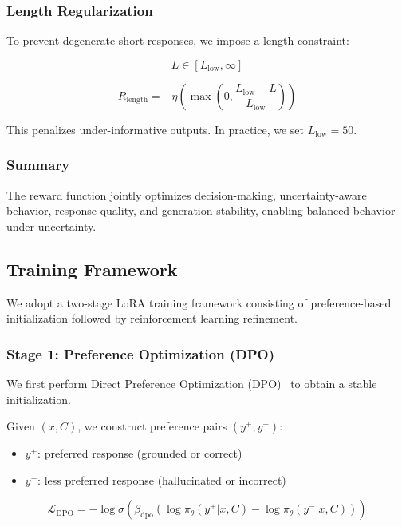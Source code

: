 \subsubsection{Length Regularization}

To prevent degenerate short responses, we impose a length constraint:

\[
L \in [L_{\text{low}}, \infty]
\]

\[
R_{\text{length}} =
-\eta \left(
\max\left(0, \frac{L_{\text{low}} - L}{L_{\text{low}}}\right)
\right)
\]

This penalizes under-informative outputs. In practice, we set $L_{\text{low}} = 50$.

\subsubsection{Summary}

The reward function jointly optimizes decision-making, uncertainty-aware behavior, response quality, and generation stability, enabling balanced behavior under uncertainty.


\subsection{Training Framework}

We adopt a two-stage LoRA training framework consisting of preference-based initialization followed by reinforcement learning refinement.

\subsubsection{Stage 1: Preference Optimization (DPO)}

We first perform Direct Preference Optimization (DPO)~\cite{dpo} to obtain a stable initialization.

Given $(x, C)$, we construct preference pairs $(y^{+}, y^{-})$:

\begin{itemize}
    \item $y^{+}$: preferred response (grounded or correct)
    \item $y^{-}$: less preferred response (hallucinated or incorrect)
\end{itemize}

\[
\mathcal{L}_{\text{DPO}} = - \log \sigma \left( \beta_{\text{dpo}} \left( \log \pi_{\theta}(y^{+}|x,C) - \log \pi_{\theta}(y^{-}|x,C) \right) \right)
\]

